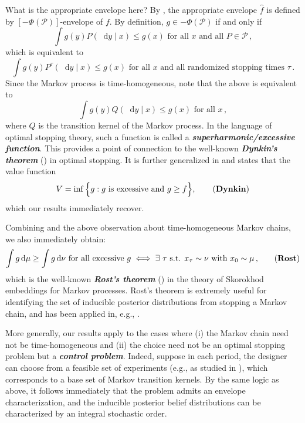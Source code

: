 \documentclass[12pt,letterpaper]{article}
\newenvironment{original}{\color{black}}{}
\theoremstyle{plain}
\theoremstyle{definition}
\theoremstyle{remark}
\renewcommand*\d{\mathop{}\!\mathrm{d}}
\theoremstyle{definition}
\begin{document}
\begin{original}
What is the appropriate envelope here? By , the appropriate envelope $\widehat{f}$ is defined by $[-\Phi(\mathcal{P})]$-envelope of $f$. By definition, $g \in -\Phi(\mathcal{P})$ if and only if
\[\int g(y) P(\d y\mid x) \leq g(x) \text{ for all $x$ and all $P \in \mathcal{P}$}\,,\]
which is equivalent to
\[\int g(y) P^\tau(\d y\mid x) \leq g(x) \text{ for all $x$ and all randomized stopping times $\tau$}\,.\]
Since the Markov process is time-homogeneous, note that the above is equivalent to
\[\int g(y) Q(\d y\mid x) \leq g(x) \text{ for all $x$}\,,\]
where $Q$ is the transition kernel of the Markov process. In the language of optimal stopping theory, such a function is called a \textit{\textbf{superharmonic/excessive function}}. This provides a point of connection to the well-known \textit{\textbf{Dynkin's theorem}} (\citealt{dynkin1963optimal}) in optimal stopping. It is further generalized in  \citet{dayanik2003optimal} and states that the value function
\[V = \inf\Big\{g : g \text{ is excessive and } g \geq f \Big\}, \tag{\textbf{Dynkin}}\]
which our results immediately recover.

Combining  and the above observation about time-homogeneous Markov chains, we also immediately obtain:
\[\int g \d \mu \geq \int g \d \nu \text{ for all excessive $g$} \iff \text{$\exists$ $\tau$ s.t. $x_\tau  \sim \nu$ with $x_0 \sim \mu$\,,} \tag{\textbf{Rost}}\]
which is the well-known \textit{\textbf{Rost's theorem}} (\citealt{rost1971stopping}) in the theory of Skorokhod embeddings for Markov
processes. Rost's theorem is extremely useful for identifying the set of inducible posterior distributions from stopping a Markov chain, and has been applied in, e.g., \citet{morris2019wald}.

More generally, our results apply to the cases where (i) the Markov chain need not be time-homogeneous and (ii) the choice need not be an optimal stopping problem but a \textit{\textbf{control problem}}. Indeed, suppose in each period, the designer can choose from a feasible set of experiments (e.g., as studied in \citealt*{ni2023sequential}), which corresponds to a base set of Markov transition kernels. By the same logic as above, it follows immediately that the problem admits an envelope characterization, and the inducible posterior belief distributions can be characterized by an integral stochastic order.
\end{original}
\end{document}
